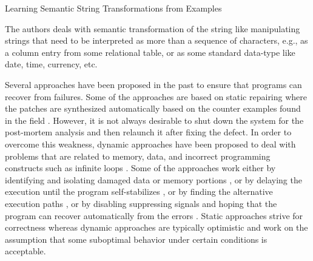 {%
Learning Semantic String Transformations from Examples

The authors deals with semantic transformation of the string like manipulating
strings that need to be interpreted as more than a sequence of characters, e.g.,
as a column entry from some relational table, or as some standard data-type like
date, time, currency, etc.



Several approaches have been proposed in the past to ensure that programs can
recover from failures. Some of the approaches are based on static repairing
where the patches are synthesized automatically based on the counter examples
found in the field \cite{wei-issta-2010}.
However, it is not always desirable to shut down the system for the post-mortem
analysis and then relaunch it after fixing the defect. In order to overcome this
weakness, dynamic approaches have been proposed to deal with problems that are
related to memory, data, and incorrect programming constructs such as infinite
loops \cite{Carbin:2011, KlingMCR12, conf/sosp/PerkinsKLABCPSSSWZER09}. Some of
the approaches work either by identifying and isolating damaged data or memory
portions \cite{conf/issre/DemskyR03, conf/icse/DemskyR05,
conf/issta/DemskyEGMPR06}, or by delaying the execution until the program
self-stabilizes \cite{Eom:2012}, or by finding the alternative execution paths
\cite{PezzeRWZ11}, or by disabling suppressing signals and hoping that the
program can recover automatically from the errors \cite{conf/pldi/LongSR14}.
Static approaches strive for correctness whereas dynamic approaches are
typically optimistic and work on the assumption that some suboptimal behavior
under certain conditions is acceptable.

}
